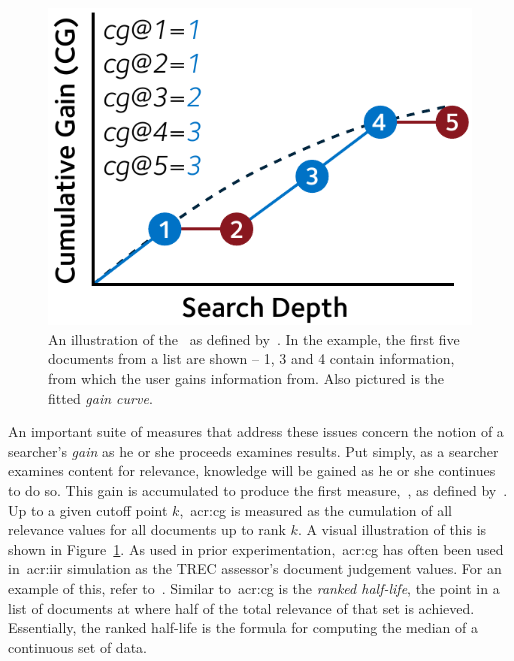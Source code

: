 \begin{figure}
    \begin{center}
    \vspace*{-10mm}
    \includegraphics[width=1\textwidth]{figures/ch2-cg.pdf}
    \end{center}
    \vspace*{-4mm}
    \caption[Cumulative Gain]{An illustration of the~ as defined by~\cite{jarvelin2000cg, jarvelin2002cg}. In the example, the first five documents from a list are shown – 1, 3 and 4 contain information, from which the user gains information from. Also pictured is the fitted \emph{gain curve}.}
    \label{fig:cg}
\end{figure}

An important suite of measures that address these issues concern the notion of a searcher's \emph{gain} as he or she proceeds examines results. Put simply, as a searcher examines content for relevance, knowledge will be gained as he or she continues to do so. This gain is accumulated to produce the first measure,~, as defined by~\cite{jarvelin2000cg, jarvelin2002cg}. Up to a given cutoff point $k$,~\gls{acr:cg} is measured as the cumulation of all relevance values for all documents up to rank $k$. A visual illustration of this is shown in Figure~\ref{fig:cg}. As used in prior experimentation,~\gls{acr:cg} has often been used in~\gls{acr:iir} simulation as the TREC assessor's document judgement values. For an example of this, refer to~\cite{maxwell2016agents}. Similar to~\gls{acr:cg} is the \emph{ranked half-life}, the point in a list of documents at where half of the total relevance of that set is achieved. Essentially, the ranked half-life is the formula for computing the median of a continuous set of data.


